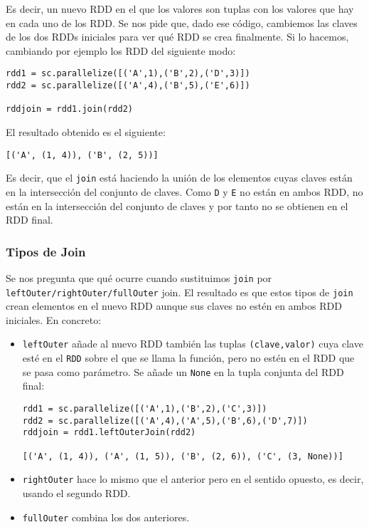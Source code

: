\documentclass[11pt]{article}
\def\inline{\lstinline[basicstyle=\ttfamily,keywordstyle={}]}
\begin{document}
Es decir, un nuevo RDD en el que los valores son tuplas con los valores que hay en cada uno de los RDD. Se nos pide que, dado ese código, cambiemos las claves de los dos RDDs iniciales para ver qué RDD se crea finalmente. Si lo hacemos, cambiando por ejemplo los RDD del siguiente modo:
\begin{verbatim}
rdd1 = sc.parallelize([('A',1),('B',2),('D',3)])
rdd2 = sc.parallelize([('A',4),('B',5),('E',6)])

rddjoin = rdd1.join(rdd2)
\end{verbatim}
El resultado obtenido es el siguiente:
\begin{verbatim}
[('A', (1, 4)), ('B', (2, 5))]
\end{verbatim}
Es decir, que el \inline{join} está haciendo la unión de los elementos cuyas claves están en la intersección del conjunto de claves. Como \inline{D} y \inline{E} no están en ambos RDD, no están en la intersección del conjunto de claves y por tanto no se obtienen en el RDD final.

\subsubsection*{ Tipos de Join }

Se nos pregunta que qué ocurre cuando sustituimos \inline{join} por \inline{leftOuter/rightOuter/fullOuter} join. El resultado es que estos tipos de \inline{join} crean elementos en el nuevo RDD aunque sus claves no estén en ambos RDD iniciales. En concreto:

\begin{itemize}
		\item \inline{leftOuter} añade al nuevo RDD también las tuplas \inline{(clave,valor)} cuya clave esté en el \inline{RDD} sobre el que se llama la función, pero no estén en el RDD que se pasa como parámetro. Se añade un \inline{None} en la tupla conjunta del RDD final:
		
		\begin{verbatim}
rdd1 = sc.parallelize([('A',1),('B',2),('C',3)])
rdd2 = sc.parallelize([('A',4),('A',5),('B',6),('D',7)])
rddjoin = rdd1.leftOuterJoin(rdd2)

[('A', (1, 4)), ('A', (1, 5)), ('B', (2, 6)), ('C', (3, None))]
		\end{verbatim}
	
		\item \inline{rightOuter} hace lo mismo que el anterior pero en el sentido opuesto, es decir, usando el segundo RDD.
		\item \inline{fullOuter} combina los dos anteriores.
\end{itemize}
\end{document}
